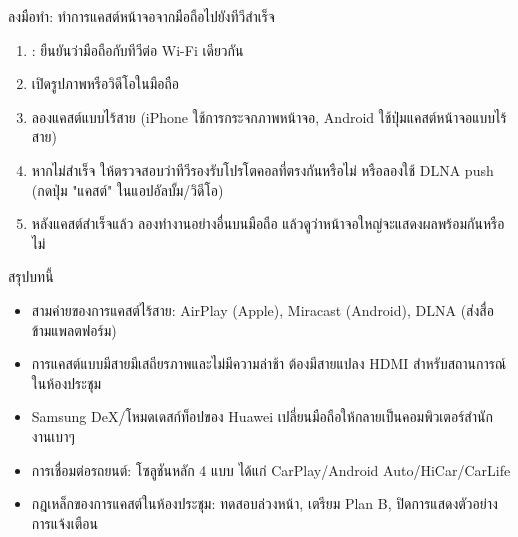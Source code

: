 \begin{tcbpractice}{ลงมือทำ: ทำการแคสต์หน้าจอจากมือถือไปยังทีวีสำเร็จ}
\begin{enumerate}
  \item : ยืนยันว่ามือถือกับทีวีต่อ Wi-Fi เดียวกัน
  \item เปิดรูปภาพหรือวิดีโอในมือถือ
  \item ลองแคสต์แบบไร้สาย (iPhone ใช้การกระจกภาพหน้าจอ, Android ใช้ปุ่มแคสต์หน้าจอแบบไร้สาย)
  \item หากไม่สำเร็จ ให้ตรวจสอบว่าทีวีรองรับโปรโตคอลที่ตรงกันหรือไม่ หรือลองใช้ DLNA push (กดปุ่ม "แคสต์" ในแอปอัลบั้ม/วิดีโอ)
  \item หลังแคสต์สำเร็จแล้ว ลองทำงานอย่างอื่นบนมือถือ แล้วดูว่าหน้าจอใหญ่จะแสดงผลพร้อมกันหรือไม่
\end{enumerate}

\end{tcbpractice}

\begin{tcbsummary}{สรุปบทนี้}
\begin{itemize}
  \item สามค่ายของการแคสต์ไร้สาย: AirPlay (Apple), Miracast (Android), DLNA (ส่งสื่อข้ามแพลตฟอร์ม)
  \item การแคสต์แบบมีสายมีเสถียรภาพและไม่มีความล่าช้า ต้องมีสายแปลง HDMI สำหรับสถานการณ์ในห้องประชุม
  \item Samsung DeX/โหมดเดสก์ท็อปของ Huawei เปลี่ยนมือถือให้กลายเป็นคอมพิวเตอร์สำนักงานเบาๆ
  \item การเชื่อมต่อรถยนต์: โซลูชันหลัก 4 แบบ ได้แก่ CarPlay/Android Auto/HiCar/CarLife
  \item กฎเหล็กของการแคสต์ในห้องประชุม: ทดสอบล่วงหน้า, เตรียม Plan B, ปิดการแสดงตัวอย่างการแจ้งเตือน
\end{itemize}

\end{tcbsummary}
